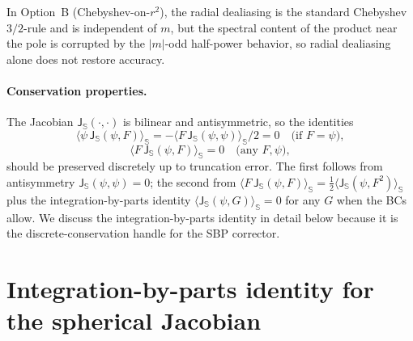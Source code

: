 \documentclass[11pt]{article}
\newcommand{\Jsphere}{\mathsf{J}_{\mathbb{S}}}
\newcommand{\meanS}[1]{\langle #1 \rangle_{\mathbb{S}}}
\begin{document}
In Option~B (Chebyshev-on-$r^{2}$), the radial dealiasing is the
standard Chebyshev $3/2$-rule and is independent of $m$, but the
spectral content of the product near the pole is corrupted by the
$|m|$-odd half-power behavior, so radial dealiasing alone does not
restore accuracy.

\paragraph{Conservation properties.}  The Jacobian
$\Jsphere(\cdot,\cdot)$ is bilinear and antisymmetric, so the
identities
\begin{equation}
  \meanS{\psi\,\Jsphere(\psi, F)} = -\meanS{F\,\Jsphere(\psi, \psi)}/2 = 0
  \quad\text{(if }F=\psi\text{)},
\end{equation}
\begin{equation}
  \meanS{F\,\Jsphere(\psi, F)} = 0
  \quad\text{(any }F, \psi\text{)},
\end{equation}
should be preserved discretely up to truncation error.  The first
follows from antisymmetry $\Jsphere(\psi,\psi) = 0$; the second from
$\meanS{F\,\Jsphere(\psi, F)} = \tfrac{1}{2}\meanS{\Jsphere(\psi, F^{2})}$
plus the integration-by-parts identity
$\meanS{\Jsphere(\psi, G)} = 0$ for any $G$ when the BCs allow.
We discuss the integration-by-parts identity in detail below
because it is the discrete-conservation handle for the SBP corrector.

\section{Integration-by-parts identity for the spherical Jacobian}
\label{sec:ibp}
\end{document}
